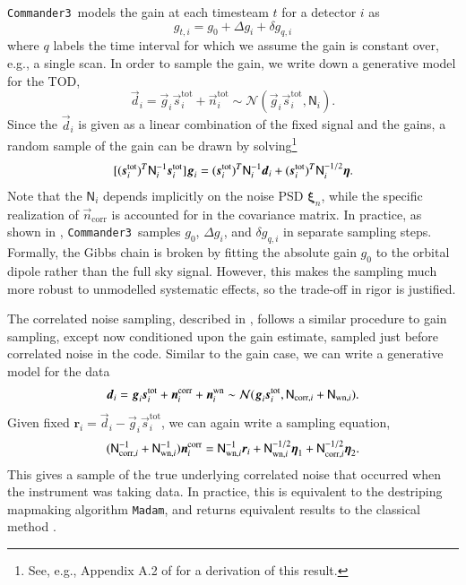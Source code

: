 \documentclass[twocolumn]{../../common/aa}
\def\commanderthree{\texttt{Commander3}}
\newcommand{\dv}[0]{\vec{d}}
\newcommand{\n}[0]{\vec{n}}
\newcommand{\s}[0]{\vec{s}}
\newcommand{\g}[0]{\vec{g}}
\newcommand{\N}[0]{\tens{N}}
\newcommand{\ncorr}{\vec n_\mathrm{corr}}
\begin{document}
\commanderthree\ models the gain at each timesteam $t$ for a detector $i$ as
\begin{equation}
	g_{t,i}=g_0+\Delta g_i+\delta g_{q,i}
\end{equation}
where $q$ labels the time interval for which we assume the gain is constant over, e.g., a single scan. In order to sample the gain, we write down a generative model for the TOD,
\begin{equation}
	\dv_i=\g_{i}\s_{i}^\mathrm{tot} +\n_{i}^\mathrm{tot}\sim\mathcal N(\g_i\s_{i}^\mathrm{tot},\mathsf N_i).
\end{equation}
Since the $\dv_i$ is given as a linear combination of the fixed signal and the gains, a random sample of the gain can be drawn by solving\footnote{See, e.g., Appendix A.2 of \citet{bp01} for a derivation of this result.}
\begin{equation}
	\label{eq:gain_gauss_samp}
	[(\s_i^\mathrm{tot})^T\mathsf N_i^{-1}\s_i^\mathrm{tot}]\g_i
	=(\s_i^\mathrm{tot})^T\N^{-1}_i\dv_i
	+(\s_i^\mathrm{tot})^T\N^{-1/2}_i\boldsymbol\eta.
\end{equation}
Note that the $\mathsf N_i$ depends implicitly on the noise PSD $\boldsymbol \xi_n$, while the specific realization of $\ncorr$ is accounted for in the covariance matrix.
In practice, as shown in \citet{bp07}, \commanderthree\ samples $g_0$, $\Delta g_i$, and $\delta g_{q,i}$ in separate sampling steps. Formally, the Gibbs chain is broken by fitting the absolute gain $g_0$ to the orbital dipole rather than the full sky signal. However, this makes the sampling much more robust to unmodelled systematic effects, so the trade-off in rigor is justified.

The correlated noise sampling, described in \citet{bp06}, follows a similar procedure to gain sampling, except now conditioned upon the gain estimate, sampled just before correlated noise in the code. Similar to the gain case, we can write a generative model for the data
\begin{equation}
	\dv_i=\g_i\s_i^\mathrm{tot}+\n_i^\mathrm{corr}+\n^\mathrm{wn}_i
	\sim\mathcal N(\g_i\s_i^\mathrm{tot},\N_{\mathrm{corr},i}+\N_{\mathrm{wn},i}).
\end{equation}
Given fixed $\boldsymbol r_i=\dv_i-\g_i\s_i^\mathrm{tot}$, we can again write a sampling equation, 
\begin{equation}
	\label{eq:ncorr_gauss_samp}
	(\N_{\mathrm{corr},i}^{-1}+\N_{\mathrm{wn},i}^{-1})
	\n^\mathrm{corr}_i
	=\N^{-1}_{\mathrm{wn},i}\boldsymbol r_i
	+\N^{-1/2}_{\mathrm{wn},i}\boldsymbol\eta_1
	+\N^{-1/2}_{\mathrm{corr},i}\boldsymbol\eta_2.
\end{equation}
This gives a sample of the true underlying correlated noise that occurred when the instrument was taking data. In practice, this is equivalent to the destriping mapmaking algorithm \texttt{Madam}, and returns equivalent results to the classical method \citep{bp02}.
\end{document}

